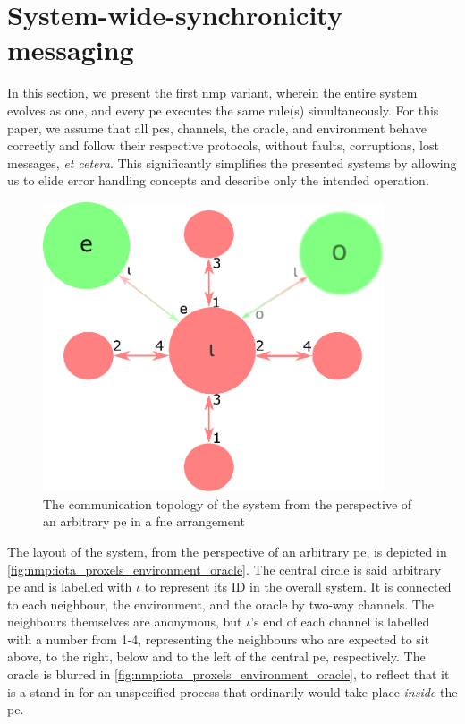 \section{\label{sec:nmp:systemwide}System-wide-synchronicity messaging}

\cpresetrulenumber

In this section, we present the first \gls{nmp} variant, wherein the entire system evolves as one, and every \gls{pe} executes the same rule(s) simultaneously.  For this paper, we assume that all \glspl{pe}, channels, the oracle, and environment behave correctly and follow their respective protocols, without faults, corruptions, lost messages, \textit{et cetera}.  This significantly simplifies the presented systems by allowing us to elide error handling concepts and describe only the intended operation.

\begin{figure}
    \centering
    \includegraphics[width=0.9\textwidth]{chapters/nmp/images/iota_proxels_environment_oracle_v4.pdf}
    \caption{The communication topology of the system from the perspective of an arbitrary \gls{pe} in a \gls{fne} arrangement}
    \label{fig:nmp:iota_proxels_environment_oracle}
\end{figure}

The layout of the system, from the perspective of an arbitrary \gls{pe}, is depicted in \autoref{fig:nmp:iota_proxels_environment_oracle}.  The central circle is said arbitrary \gls{pe} and is labelled with \(\iota\) to represent its ID in the overall system.  It is connected to each neighbour, the environment, and the oracle by two-way channels.  The neighbours themselves are anonymous, but \(\iota\)'s end of each channel is labelled with a number from 1-4, representing the neighbours who are expected to sit above, to the right, below and to the left of the central \gls{pe}, respectively.  The oracle is blurred in \autoref{fig:nmp:iota_proxels_environment_oracle}, to reflect that it is a stand-in for an unspecified process that ordinarily would take place \emph{inside} the \gls{pe}.

